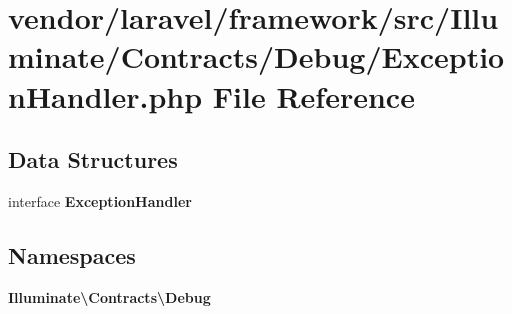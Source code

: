 \section{vendor/laravel/framework/src/\+Illuminate/\+Contracts/\+Debug/\+Exception\+Handler.php File Reference}
\label{laravel_2framework_2src_2_illuminate_2_contracts_2_debug_2_exception_handler_8php}
\subsection*{Data Structures}
\begin{DoxyCompactItemize}
\item 
interface {\bf Exception\+Handler}
\end{DoxyCompactItemize}
\subsection*{Namespaces}
\begin{DoxyCompactItemize}
\item 
 {\bf Illuminate\textbackslash{}\+Contracts\textbackslash{}\+Debug}
\end{DoxyCompactItemize}
